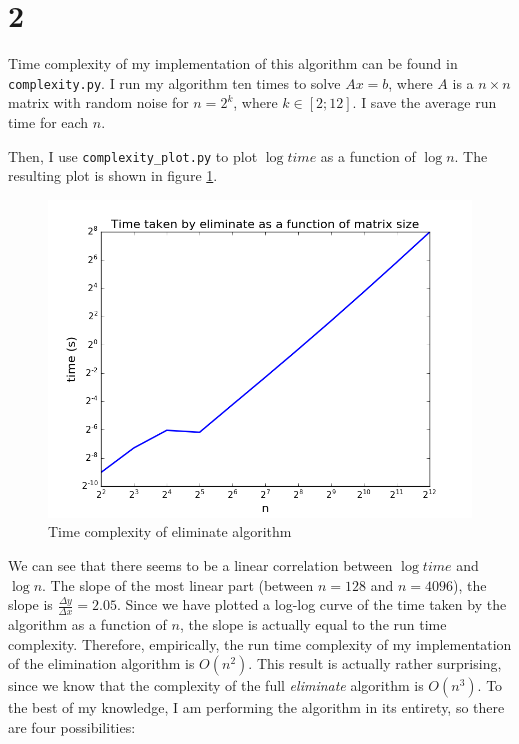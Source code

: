 \documentclass[]{article}
\begin{document}
\section*{2}
Time complexity of my implementation of this algorithm can be found in \texttt{complexity.py}. I run my algorithm ten times to solve $Ax = b$, where $A$ is a $n \times n$ matrix with random noise for $n = 2^k$, where $k \in [2; 12]$. I save the average run time for each $n$.

Then, I use \texttt{complexity\_plot.py} to plot $\log{time}$ as a function of $\log{n}$. The resulting plot is shown in figure \ref{complexity}.

\begin{figure}[h]
\centering
\includegraphics{complexity.png}
\caption{Time complexity of eliminate algorithm}
\label{complexity}
\end{figure}

We can see that there seems to be a linear correlation between $\log{time}$ and $\log{n}$. The slope of the most linear part (between $n = 128$ and $n = 4096$), the slope is $\frac{\Delta y}{\Delta x} = 2.05$. Since we have plotted a log-log curve of the time taken by the algorithm as a function of $n$, the slope is actually equal to the run time complexity. Therefore, empirically, the run time complexity of my implementation of the elimination algorithm is $O(n^2)$. This result is actually rather surprising, since we know that the complexity of the full \textit{eliminate} algorithm is $O(n^3)$. To the best of my knowledge, I am performing the algorithm in its entirety, so there are four possibilities:
\end{document}
